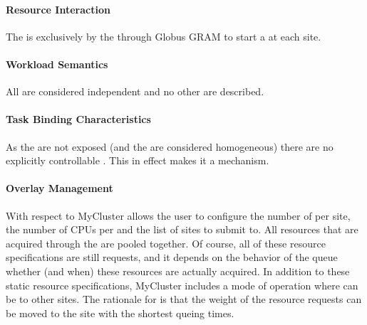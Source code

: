 \documentclass{sig-alternate}
\begin{document}
\paragraph{Resource Interaction}
The  is exclusively by the 
through Globus GRAM to start a  at each site.

\paragraph{Workload Semantics}
All  are considered independent and no other  are described.

\paragraph{Task Binding Characteristics}
As the \pilots are not exposed (and the  are considered
homogeneous) there are no explicitly controllable . This in effect makes it a  mechanism.

\paragraph{Overlay Management}
With respect to  MyCluster allows the user to
configure the number of  per site, the number of CPUs per
 and the list of sites to submit to.
All resources that are acquired through the  are pooled
together.
Of course, all of these resource specifications are still requests, and it
depends on the behavior of the queue whether (and when) these resources are
actually acquired.
In addition to these static resource specifications, MyCluster includes a mode
of operation where  can be  to other sites.
The rationale for  is that the weight of the resource
requests can be moved to the site with the shortest queing times.
\end{document}
